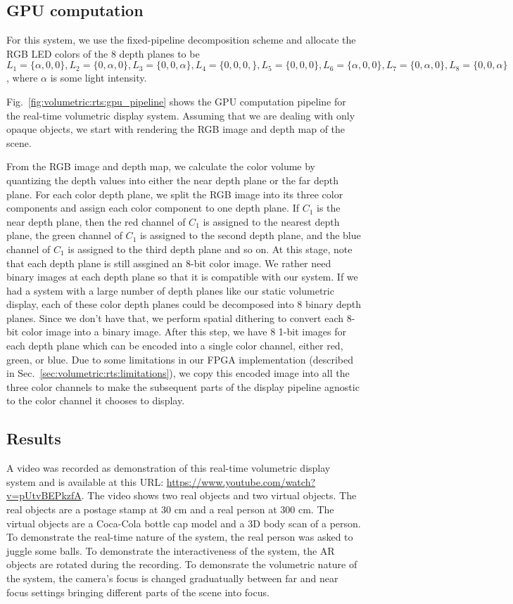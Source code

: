 \subsection{GPU computation}

For this system, we use the fixed-pipeline decomposition scheme and allocate the RGB LED colors of the 8 depth planes to be $L_1 = \{\alpha, 0, 0\}, L_2 = \{0, \alpha, 0\}, L_3 = \{0, 0, \alpha\}, L_4 = \{0, 0, 0,\}, L_5 = \{0, 0, 0\}, L_6 = \{\alpha, 0,0\}, L_7 = \{0, \alpha,0\}, L_8 = \{0, 0, \alpha\}$, where $\alpha$ is some light intensity.

Fig.~\ref{fig:volumetric:rts:gpu_pipeline} shows the GPU computation pipeline for the real-time volumetric display system. Assuming that we are dealing with only opaque objects, we start with rendering the RGB image and depth map of the scene.

From the RGB image and depth map, we calculate the color volume by quantizing the depth values into either the near depth plane or the far depth plane.
For each color depth plane, we split the RGB image into its three color components and assign each color component to one depth plane. 
If $C_1$ is the near depth plane, then the red channel of $C_1$ is assigned to the nearest depth plane, the green channel of $C_1$ is assigned to the second depth plane, and the blue channel of $C_1$ is assigned to the third depth plane and so on.
At this stage, note that each depth plane is still assgined an 8-bit color image.
We rather need binary images at each depth plane so that it is compatible with our system. 
If we had a system with a large number of depth planes like our static volumetric display, each of these color depth planes could be decomposed into 8 binary depth planes.
Since we don't have that, we perform spatial dithering to convert each 8-bit color image into a binary image. 
After this step, we have 8 1-bit images for each depth plane which can be encoded into a single color channel, either red, green, or blue.
Due to some limitations in our FPGA implementation (described in Sec.~\ref{sec:volumetric:rts:limitations}), we copy this encoded image into all the three color channels to make the subsequent parts of the display pipeline agnostic to the color channel it chooses to display.

\subsection{Results}
A video was recorded as demonstration of this real-time volumetric display system and is available at this URL: \url{https://www.youtube.com/watch?v=pUtvBEPkzfA}. 
The video shows two real objects and two virtual objects. 
The real objects are a postage stamp at 30 cm and a real person at 300 cm.
The virtual objects are a Coca-Cola bottle cap model and a 3D body scan of a person.
To demonstrate the real-time nature of the system, the real person was asked to juggle some balls.
To demonstrate the interactiveness of the system, the AR objects are rotated during the recording.
To demonsrate the volumetric nature of the system, the camera's focus is changed graduatually between far and near focus settings bringing different parts of the scene into focus.

